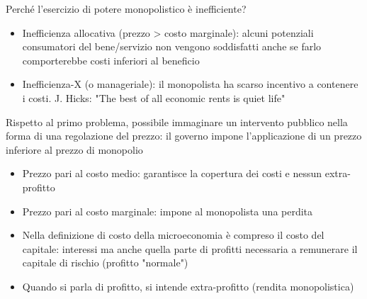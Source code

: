 \documentclass[aspectratio=64,11pt]{beamer}
\begin{document}
\begin{frame}{Perché l'esercizio di potere monopolistico è inefficiente?}
\begin{itemize}
\item \alert{Inefficienza allocativa} (prezzo > costo marginale): alcuni potenziali
consumatori del bene/servizio non vengono soddisfatti anche se farlo
comporterebbe costi inferiori al beneficio
\item \alert{Inefficienza-X} (o manageriale): il monopolista ha scarso incentivo a
contenere i costi. J. Hicks: "The best of all economic rents is quiet life"
\end{itemize}

Rispetto al primo problema, possibile immaginare un intervento pubblico nella
forma di una \alert{regolazione del prezzo}: il governo impone l'applicazione di un
prezzo inferiore al prezzo di monopolio

\begin{itemize}
\item Prezzo pari al \alert{costo medio}: garantisce la copertura dei costi e nessun
extra-profitto
\item Prezzo pari al \alert{costo marginale}: impone al monopolista una perdita
\end{itemize}
\begin{block}{}
\begin{itemize}
\item Nella definizione di costo della microeconomia è compreso il \alert{costo del
capitale}: interessi ma anche quella parte di profitti necessaria a remunerare
il capitale di rischio (profitto "normale")
\item Quando si parla di profitto, si intende extra-profitto (rendita monopolistica)
\end{itemize}
\end{block}
\end{frame}
\end{document}
